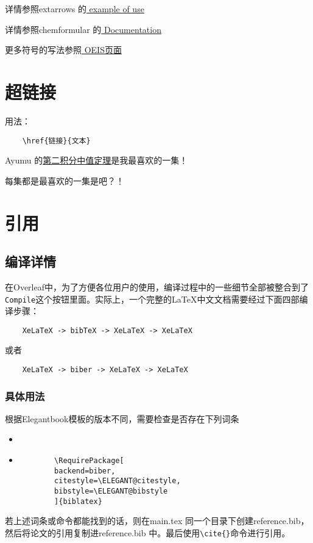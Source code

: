 \begin{remark}
详情参照extarrows 的\href{https://ftp.fau.de/ctan/macros/latex/contrib/extarrows/extarrows-test.pdf}{ example of use}
\end{remark}
\begin{remark}
详情参照chemformular 的\href{https://ftp.mpi-inf.mpg.de/pub/tex/mirror/ftp.dante.de/pub/tex/macros/latex/contrib/chemformula/chemformula-manual.pdf}{ Documentation}
\end{remark}
\begin{remark}
更多符号的写法参照\href{https://oeis.org/wiki/List_of_LaTeX_mathematical_symbols}{ OEIS页面}
\end{remark}
\section{超链接}
用法：
\begin{verbatim}
    \href{链接}{文本}
\end{verbatim}
    
Ayumu 的\href{https://www.bilibili.com/video/BV1ve4y1m7hP/?spm_id_from=333.1007.top_right_bar_window_history.content.click&vd_source=4530026c0834d011205a1c8aae339ab9}{第二积分中值定理}是我最喜欢的一集！

\begin{remark}
每集都是最喜欢的一集是吧？！
\end{remark}
\section{引用}
\subsection{编译详情}
在Overleaf中，为了方便各位用户的使用，编译过程中的一些细节全部被整合到了\Verb"Compile"这个按钮里面。实际上，一个完整的\LaTeX 中文文档需要经过下面四部编译步骤：
\begin{verbatim}
    XeLaTeX -> bibTeX -> XeLaTeX -> XeLaTeX
\end{verbatim}    
或者
\begin{verbatim}
    XeLaTeX -> biber -> XeLaTeX -> XeLaTeX
\end{verbatim}    
\subsubsection{具体用法}
根据Elegantbook模板的版本不同，需要检查是否存在下列词条
\begin{itemize}
    \item 
    \begin{verbatim}
        
    \end{verbatim}
    \item 
    \begin{verbatim}
        \RequirePackage[
        backend=biber,
        citestyle=\ELEGANT@citestyle,
        bibstyle=\ELEGANT@bibstyle
        ]{biblatex}
    \end{verbatim}
\end{itemize}
若上述词条或命令都能找到的话，则在main.tex 同一个目录下创建reference.bib，然后将论文的引用复制进reference.bib 中。最后使用\Verb"\cite{}"命令进行引用。

